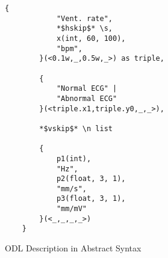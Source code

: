 \begin{figure}[h]
\begin{minipage}{0.45\textwidth}
\begin{lrbox}{\absflisting}
\begin{lstlisting}[basicstyle=\tiny,]
        {
            "Vent. rate",
            *$hskip$* \s,
            x(int, 60, 100),
            "bpm",
        }(<0.1w,_,0.5w,_>) as triple,

        {
            "Normal ECG" | 
            "Abnormal ECG"
        }(<triple.x1,triple.y0,_,_>),

        *$vskip$* \n list
        
        {
            p1(int),
            "Hz",
            p2(float, 3, 1),
            "mm/s",
            p3(float, 3, 1),
            "mm/mV"
        }(<_,_,_,_>)
    }
\end{lstlisting}
\end{lrbox}
\centering
\scalebox{0.6}{\usebox\absflisting}
\caption{ODL Description in Abstract Syntax}
\label{fig:absdes}
\end{minipage}
\end{figure}

